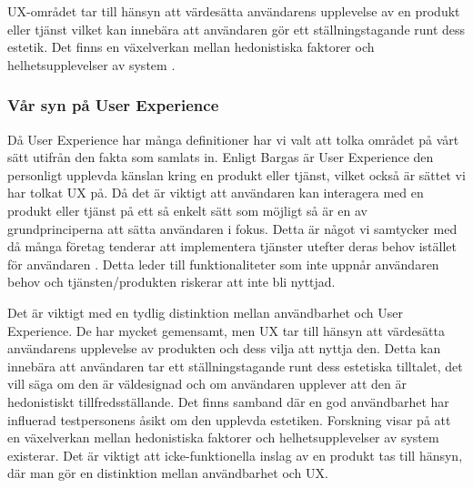 UX-området tar till hänsyn att värdesätta användarens upplevelse av en produkt eller tjänst vilket kan innebära att användaren gör ett ställningstagande runt dess estetik\cite{TuchIsHCI}. Det finns en växelverkan mellan hedonistiska faktorer och helhetsupplevelser av system \cite{TuchIsHCI}.
\newline


\subsubsection{Vår syn på User Experience}
Då User Experience har många definitioner har vi valt att tolka området på vårt sätt utifrån den fakta som samlats in. Enligt Bargas \cite{Bargas-AvilaOldExperience} är User Experience den personligt upplevda känslan kring en produkt eller tjänst, vilket också är sättet vi har tolkat UX på. Då det är viktigt att användaren kan interagera med en produkt eller tjänst på ett så enkelt sätt som möjligt så är en av grundprinciperna att sätta användaren i fokus. Detta är något vi samtycker med då många företag tenderar att implementera tjänster utefter deras behov istället för användaren \cite{PlaneradBokhandel}. Detta leder till funktionaliteter som inte uppnår användaren behov och tjänsten/produkten riskerar att inte bli nyttjad.
\newline

Det är viktigt med en tydlig distinktion mellan användbarhet och User Experience. De har mycket gemensamt, men UX tar till hänsyn att värdesätta användarens upplevelse av produkten och dess vilja att nyttja den. Detta kan innebära att användaren tar ett ställningstagande runt dess estetiska tilltalet, det vill säga om den är väldesignad och om användaren upplever att den är hedonistiskt tillfredsställande. Det finns samband där en god användbarhet har influerad testpersonens åsikt om den upplevda estetiken\cite{Gualtieri2009BestDesign}. Forskning visar på att en växelverkan mellan hedonistiska faktorer och helhetsupplevelser av system existerar\cite{TuchIsHCI}. Det är viktigt att icke-funktionella inslag av en produkt tas till hänsyn, där man gör en distinktion mellan användbarhet och UX. 
\newline

